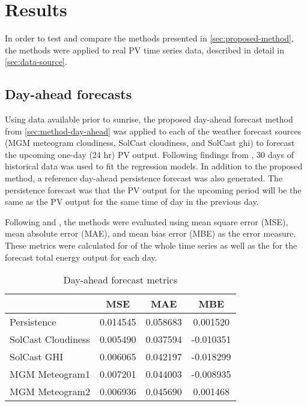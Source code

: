 \section{Results}
\label{sec:results}

In order to test and compare the methods presented in \cref{sec:proposed-method},
the methods were applied to real PV time series data, described in detail in \cref{sec:data-source}.

\subsection{Day-ahead forecasts}

Using data available prior to sunrise, the proposed day-ahead forecast method from  \cref{sec:method-day-ahead} was applied to each of the weather forecast sources
(MGM meteogram cloudiness, SolCast cloudiness, and SolCast ghi)
to forecast the upcoming one-day (24 hr) PV output.
Following findings from \cite{Almeida2015},
30 days of historical data was used to fit the regression models.
In addition to the proposed method, a reference day-ahead persistence forecast was also generated.
The persistence forecast was that the PV output for the upcoming period will be the same as the PV output for the same time of day in the previous day.

Following \cite{Pedro2012} and \cite{Gigoni2018}, the methods were evaluated using mean square error (MSE), mean absolute error (MAE), and mean bias error (MBE) as the error measure.
These metrics were calculated for of the whole time series as well as the for the forecast total energy output for each day.

\begin{table}[tbh]
	\caption{Day-ahead forecast metrics}
	\label{table:variables}
	\begin{tabular}{lccc}
		\toprule
		                       &   MSE    &   MAE    &    MBE    \\
        \midrule
		Persistence            & 0.014545 & 0.058683 & 0.001520  \\
		SolCast Cloudiness     & 0.005490 & 0.037594 & -0.010351 \\
		SolCast GHI            & 0.006065 & 0.042197 & -0.018299 \\
		MGM Meteogram1         & 0.007201 & 0.044003 & -0.008935 \\
		MGM Meteogram2         & 0.006936 & 0.045690 & 0.001468  \\
		\bottomrule
	\end{tabular}
\end{table}

